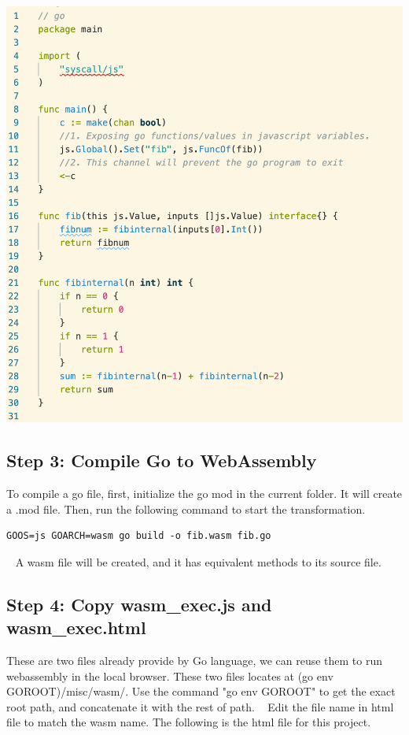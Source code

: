 \documentclass[12pt]{article}
\begin{document}
\includegraphics[scale = 0.6]{img/go-fib}

\subsection{Step 3: Compile Go to WebAssembly}
To compile a go file, first, initialize the go mod in the current folder. It will create a .mod file. Then, run the following 
command to start the transformation.
~\newline
\begin{verbatim}
GOOS=js GOARCH=wasm go build -o fib.wasm fib.go
\end{verbatim}
~\newline
A wasm file will be created, and it has equivalent methods to its source file.

\subsection{Step 4: Copy wasm\_exec.js and wasm\_exec.html}
These are two files already provide by Go language, we can reuse them to run webassembly in the local browser. These two files 
locates at (go env GOROOT)/misc/wasm/. Use the command "go env GOROOT" to get the exact root path, and concatenate it with the 
rest of path.
~\newline
Edit the file name in html file to match the wasm name. The following is the html file for this project.
~\newline
\end{document}
